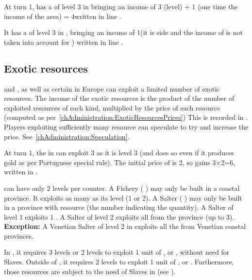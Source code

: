 \begin{exemple}
  At turn 1, \POR has a \COL of level 3 in 
  bringing an income of 3 (level) + 1 (one time the income of the
   area) = 4\ducats written in line
  .

  It has a \TP of level 3 in , bringing an income
  of 1\ducats (it is side \Facemoins and the income of
  \granderegionCotedor is not taken into account for \TP) written in
  line .
\end{exemple}

\subsection{Exotic resources}
\label{chIncomes:Exotic ressources}
\aparag \COL and \TP, as well as certain \MNU in Europe can exploit a
limited number of exotic resources.
\bparag The income of the exotic resources is the product of the number
of exploited resources of each kind, multiplied by the price of each
resource (computed as per~\ref{chAdministration:ExoticResourcesPrices})
\bparag This is recorded in .
\bparag Players exploiting sufficiently many resource can speculate to
try and increase the price. See~\ref{chAdministration:Speculation}.

\begin{exemple}
  At turn 1, the \TP in  can exploit 3 
  as it is level 3 (and does so even if it produces gold as per
  Portuguese special rule). The initial price of  is
  2\ducats, so \POR gains 3$\times$2=6\ducats, written in
  .
\end{exemple}

\aparag[Manufactures] \MNU can have only 2 levels per counter.
\bparag A Fishery ( \MNU) may only be built in a coastal
province. It exploits as many  as its level (1 or 2).
\bparag A Salter ( \MNU) may only be built in a province with
 resource (the number indicating the quantity).
\bparag A Salter of level 1 exploits 1 .
\bparag A Salter of level 2 exploits all  from the province (up to
3).
\bparag \textbf{Exception:} A Venetian Salter of level 2 in \provinceVeneto
exploits all the  from Venetian coastal provinces.

\bparag In , it requires 3 \TP levels or 2 \COL levels to
exploit 1 unit of ,  or ,
without need for Slaves.
\bparag Outside of , it requires 2 \COL levels to exploit 1
unit of ,  or . Furthermore,
those resources are subject to the need of Slaves in  (see
).

